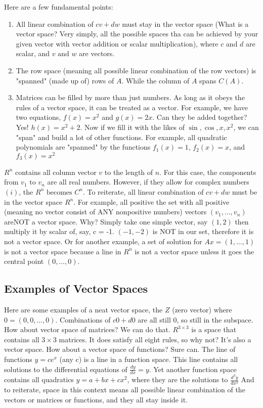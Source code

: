 Here are a few fundamental points:
\begin{enumerate}
    \item All linear combination of \(cv + dw\) must stay in the vector space (What is a vector space? Very simply, all the possible spaces tha can be achieved by your given vector with vector addition or scalar multiplication), where \(c\) and \(d\) are scalar, and \(v \text{ and } w\) are vectors.
    \item The row space (meaning all possible linear combination of the row vectors) is "spanned" (made up of) rows of \(A\). While the column of \(A\) spans \(C(A)\).
    \item Matrices can be filled by more than just numbers. As long as it obeys the rules of a vector space, it can be treated as a vector. 
    For example, we have two equations, \(f(x) = x^2\) and \(g(x) = 2x\). Can they be added together? 
    Yes! \(h(x) = x^2 + 2\). Now if we fill it with the likes of \(\sin, \cos, x, x^2\), we can "span" and build a lot of other functions. 
    For example, all quadratic polynomials are "spanned" by the functions \(f_1(x) = 1\), \(f_2(x) = x\), and \(f_3(x) = x^2\)       
\end{enumerate}

\(R^n\) contains all column vector \(v\) to the length of \(n\). For this case, the components from \(v_1 \text{ to } v_n\) are all real numbers. However, if they allow for complex numbers \((i)\), the \(R^n \text{ becomes } C^n\). 
To reiterate, all linear combination of \(cv + dw\) must be in the vector space \(R^n\).
For example, all positive the set with all positive (meaning no vector consist of ANY nonpositive numbers) vectors \((v_1, \ldots, v_n)\) areNOT a vector space. 
Why? Simply take one simple vector, say \((1, 2)\) 
then multiply it by scalar of, say, c = -1. 
\((-1, -2)\) is NOT in our set, therefore it is not a vector space.
Or for another example, a set of solution for \(Ax = (1, \ldots, 1)\) is not a vector space because a line in \(R^n\) is not a vector space unless it goes the central point \((0, \ldots, 0)\).

\subsection{Examples of Vector Spaces}

Here are some examples of a neat vector space, the \(Z\) (zero vector) where \(0 = (0, 0, \ldots, 0)\). Combinations of \(c0 + d0\) are all still 0, so  still in the subspace.
How about vector space of matrices? We can do that. \(R^{3 \times 3} \) is a space that contains all \(3 \times 3\) matrices. It does satisfy all eight rules, so why not? It's also a vector space. 
How about a vector space of functions? Sure can. The line of functions \(y = ce^x\) (any c) is a line in a function space. 
This line contains all solutions to the differential equations of \(\frac{dy}{dx} = y\). Yet another function space contains all quadratics \(y = a + bx + cx^2\), where they are the solutions to \(\frac{d^3 y}{dx^3}\)
And to reiterate, space in this context means all possible linear combination of the vectors or matrices or functions, and they all stay inside it.

